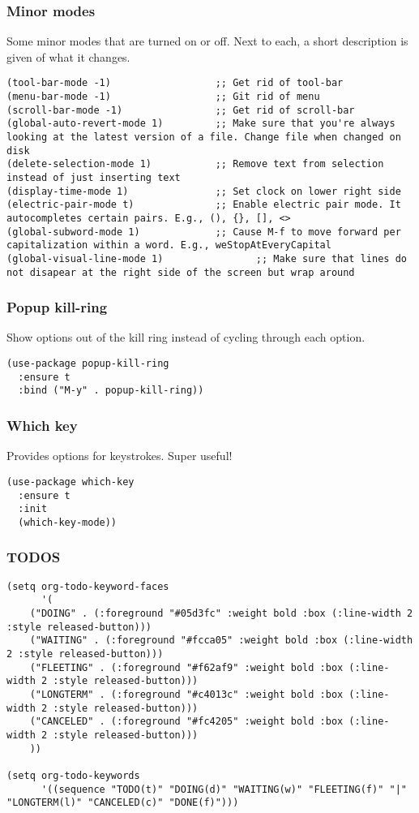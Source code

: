 \documentclass[11pt]{article}
\begin{document}
\subsubsection{Minor modes}
\label{sec:orge02286c}
Some minor modes that are turned on or off. Next to each, a short description is given of what it changes.
\begin{verbatim}
(tool-bar-mode -1)                  ;; Get rid of tool-bar
(menu-bar-mode -1)                  ;; Git rid of menu
(scroll-bar-mode -1)                ;; Get rid of scroll-bar
(global-auto-revert-mode 1)         ;; Make sure that you're always looking at the latest version of a file. Change file when changed on disk
(delete-selection-mode 1)           ;; Remove text from selection instead of just inserting text
(display-time-mode 1)               ;; Set clock on lower right side
(electric-pair-mode t)              ;; Enable electric pair mode. It autocompletes certain pairs. E.g., (), {}, [], <>
(global-subword-mode 1)             ;; Cause M-f to move forward per capitalization within a word. E.g., weStopAtEveryCapital
(global-visual-line-mode 1)                ;; Make sure that lines do not disapear at the right side of the screen but wrap around
\end{verbatim}
\subsubsection{Popup kill-ring}
\label{sec:org120d959}
Show options out of the kill ring instead of cycling through each option.
\begin{verbatim}
(use-package popup-kill-ring
  :ensure t
  :bind ("M-y" . popup-kill-ring))
\end{verbatim}
\subsubsection{Which key}
\label{sec:orga258c81}
Provides options for keystrokes. Super useful!
\begin{verbatim}
(use-package which-key
  :ensure t
  :init
  (which-key-mode))
\end{verbatim}
\subsubsection{TODOS}
\label{sec:orgd4afa48}
\begin{verbatim}
(setq org-todo-keyword-faces
      '(
	("DOING" . (:foreground "#05d3fc" :weight bold :box (:line-width 2 :style released-button)))
	("WAITING" . (:foreground "#fcca05" :weight bold :box (:line-width 2 :style released-button)))
	("FLEETING" . (:foreground "#f62af9" :weight bold :box (:line-width 2 :style released-button)))
	("LONGTERM" . (:foreground "#c4013c" :weight bold :box (:line-width 2 :style released-button)))
	("CANCELED" . (:foreground "#fc4205" :weight bold :box (:line-width 2 :style released-button)))
	))

(setq org-todo-keywords
      '((sequence "TODO(t)" "DOING(d)" "WAITING(w)" "FLEETING(f)" "|" "LONGTERM(l)" "CANCELED(c)" "DONE(f)")))
\end{verbatim}
\end{document}

